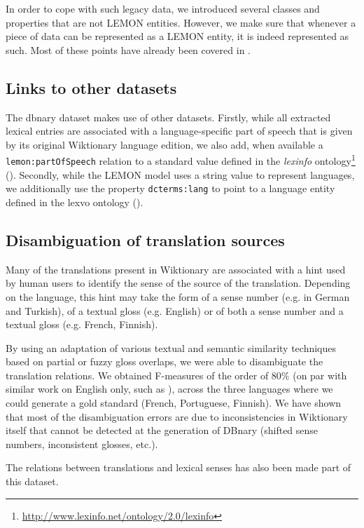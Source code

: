 \documentclass[10pt, a4paper]{article}
\begin{document}
In order to cope with such legacy data, we introduced several classes and properties that are not LEMON entities. However, we make sure that whenever a piece of data can be represented as a LEMON entity, it is indeed represented as such. Most of these points have already been covered in \cite{serasset:dbnary-swj}.

\subsection{Links to other datasets}

The dbnary dataset makes use of other datasets. Firstly, while all extracted lexical entries are associated with a language-specific part of speech that is given by its original Wiktionary language edition, we also add, when available a \texttt{lemon:partOfSpeech} relation to a standard value defined in the \textit{lexinfo} ontology\footnote{\url{http://www.lexinfo.net/ontology/2.0/lexinfo}} (\cite{Lexinfo}). Secondly, while the LEMON model uses a string value to represent languages, we additionally use the property \texttt{dcterms:lang} to point to a language entity defined in the lexvo ontology (\cite{deMeloWeikum2008c}).

\subsection{Disambiguation of translation sources}

Many of the translations present in Wiktionary are associated with a hint used by human users to identify the sense of the source of the translation. Depending on the language, this hint may take the form of a sense number (e.g. in German and Turkish), of a textual gloss (e.g. English) or of both a sense number and a textual gloss (e.g. French, Finnish).

By using an adaptation of various textual and semantic similarity techniques based on partial or fuzzy gloss overlaps, we were able to disambiguate the translation relations. We obtained F-measures of the order of 80\% (on par with similar work on English only, such as \cite{meyer-gurevych:2012:PAPERS}), across the three languages where we could generate a gold standard (French, Portuguese, Finnish). We have shown that most of the disambiguation errors are due to inconsistencies in Wiktionary itself that cannot be detected at the generation of DBnary (shifted sense numbers, inconsistent glosses, etc.).  

The relations between translations and lexical senses has also been made part of this dataset.
\end{document}
